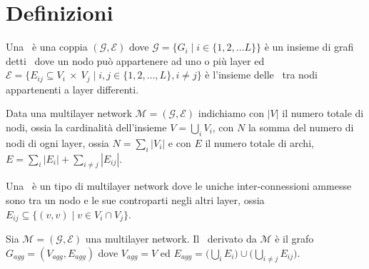 \chapter{Definizioni}

\begin{definizione} 
    \label{def:muln}
    Una \muln\ è una coppia $(\mathcal{G}, \mathcal{E} )$ dove
    $\mathcal{G} = \{G_i \mid i \in \{1, 2, \dots L\}\}$ è un insieme di grafi
    detti \layer\ dove un nodo può appartenere ad uno o più layer ed 
    $\mathcal{E} = \{E_{ij} \subseteq V_i~\times~V_j \mid i,j \in \{1, 2, \dots, L\}, i \neq j\}$
    è l'insieme delle \interc\ tra nodi appartenenti a layer differenti.
\end{definizione}
%     
% 

\begin{definizione}
    Data una multilayer network $\mathcal{M}=(\mathcal{G}, \mathcal{E})$ 
    indichiamo con $|V|$ il numero totale di nodi, ossia la cardinalità dell'insieme $V = \bigcup\limits_{i} V_i$,
    con $N$ la somma del numero di nodi di ogni layer, ossia $N = \sum_{i}{|V_i|}$
    e con $E$ il numero totale di archi, $E = \sum_{i} |E_i| + \sum_{i \neq j} |E_{ij}|$.    
\end{definizione}

\begin{definizione} 
    \label{def:mulx}
    Una \mulx\ è un tipo di multilayer network dove le uniche inter-connessioni ammesse sono tra un 
    nodo e le sue controparti negli altri layer, ossia 
    $E_{ij} \subseteq \{ (v,v) \mid v \in {V_i \cap V_j} \} $.
\end{definizione}



\begin{definizione} 
    \label{def:gragg}
    Sia $\mathcal{M} = (\mathcal{G}, \mathcal{E} )$ una multilayer network. 
    Il \gragg\ derivato da $\mathcal{M}$ è il grafo 
    $G_{\mathit{agg}} = (V_{\mathit{agg}}, E_{\mathit{agg}})$  dove $V_{\mathit{agg}} = V$ ed 
    $E_{\mathit{agg}} = \biggl( \bigcup\limits_{i} E_{i} \biggr) \cup 
                    \biggl( \bigcup\limits_{i \neq j} E_{ij} \biggr)$.
\end{definizione}

